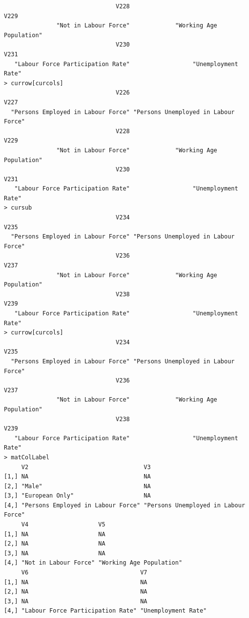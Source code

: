 \documentclass[a4paper]{article}
\begin{document}
\begin{verbatim}
                                V228                                 V229 
               "Not in Labour Force"             "Working Age Population" 
                                V230                                 V231 
   "Labour Force Participation Rate"                  "Unemployment Rate" 
> currow[curcols] 
                                V226                                 V227 
  "Persons Employed in Labour Force" "Persons Unemployed in Labour Force" 
                                V228                                 V229 
               "Not in Labour Force"             "Working Age Population" 
                                V230                                 V231 
   "Labour Force Participation Rate"                  "Unemployment Rate" 
> cursub 
                                V234                                 V235 
  "Persons Employed in Labour Force" "Persons Unemployed in Labour Force" 
                                V236                                 V237 
               "Not in Labour Force"             "Working Age Population" 
                                V238                                 V239 
   "Labour Force Participation Rate"                  "Unemployment Rate" 
> currow[curcols] 
                                V234                                 V235 
  "Persons Employed in Labour Force" "Persons Unemployed in Labour Force" 
                                V236                                 V237 
               "Not in Labour Force"             "Working Age Population" 
                                V238                                 V239 
   "Labour Force Participation Rate"                  "Unemployment Rate" 
> matColLabel 
     V2                                 V3                                  
[1,] NA                                 NA                                  
[2,] "Male"                             NA                                  
[3,] "European Only"                    NA                                  
[4,] "Persons Employed in Labour Force" "Persons Unemployed in Labour Force"
     V4                    V5                      
[1,] NA                    NA                      
[2,] NA                    NA                      
[3,] NA                    NA                      
[4,] "Not in Labour Force" "Working Age Population"
     V6                                V7                 
[1,] NA                                NA                 
[2,] NA                                NA                 
[3,] NA                                NA                 
[4,] "Labour Force Participation Rate" "Unemployment Rate"

\end{verbatim}
\end{document}

